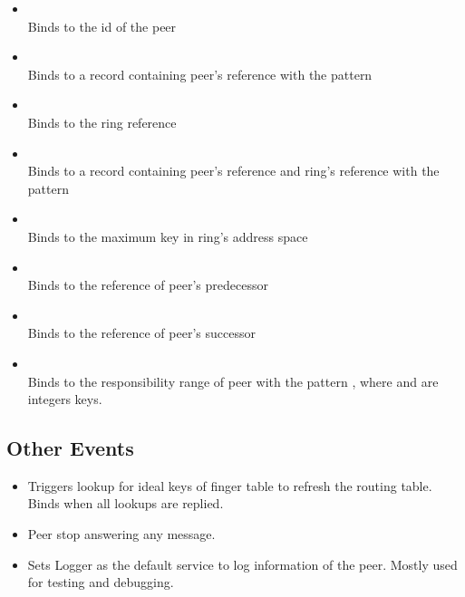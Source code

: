 \documentclass[11pt]{article}
\begin{document}
\begin{itemize}

\item {}\\ Binds  to the id of the peer

\item {}\\ Binds  to a record containing peer's
reference with the pattern\\ 

\item {}\\ Binds  to the ring reference

\item {}\\ Binds  to a record containing peer's
reference and ring's reference with the pattern  

\item {}\\ Binds  to the maximum key in ring's
address space

\item {}\\ Binds  to the reference of peer's
predecessor

\item {}\\ Binds  to the reference of peer's
successor

\item {}\\ Binds  to the responsibility range of
peer with the pattern , where  and  are
integers keys.

\end{itemize}

\subsection{Other Events}

\begin{itemize}

\item {} Triggers lookup for ideal keys of finger
table to refresh the routing table. Binds  when all lookups are
replied.

\item {} Peer stop answering any message. 

\item {} Sets Logger as the default service to log
information of the peer. Mostly used for testing and debugging.

\end{itemize}
\end{document}
